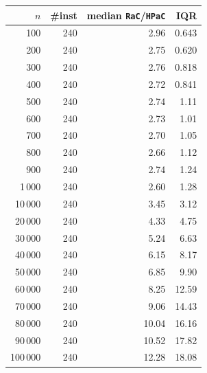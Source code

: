\begin{tabular}{@{}rrrr@{}}
\toprule
$n$ & \#inst & median \texttt{RaC}/\texttt{HPaC} & IQR \\
\midrule
100 & 240 & 2.96 & 0.643 \\
200 & 240 & 2.75 & 0.620 \\
300 & 240 & 2.76 & 0.818 \\
400 & 240 & 2.72 & 0.841 \\
500 & 240 & 2.74 & 1.11 \\
600 & 240 & 2.73 & 1.01 \\
700 & 240 & 2.70 & 1.05 \\
800 & 240 & 2.66 & 1.12 \\
900 & 240 & 2.74 & 1.24 \\
1\,000 & 240 & 2.60 & 1.28 \\
10\,000 & 240 & 3.45 & 3.12 \\
20\,000 & 240 & 4.33 & 4.75 \\
30\,000 & 240 & 5.24 & 6.63 \\
40\,000 & 240 & 6.15 & 8.17 \\
50\,000 & 240 & 6.85 & 9.90 \\
60\,000 & 240 & 8.25 & 12.59 \\
70\,000 & 240 & 9.06 & 14.43 \\
80\,000 & 240 & 10.04 & 16.16 \\
90\,000 & 240 & 10.52 & 17.82 \\
100\,000 & 240 & 12.28 & 18.08 \\
\bottomrule
\end{tabular}
